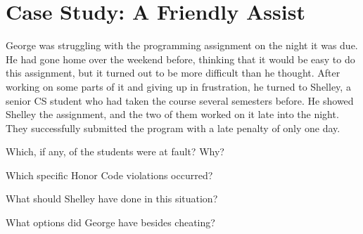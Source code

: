\section*{Case Study: A Friendly Assist}

George was struggling with the programming assignment on the night it was due.
He had gone home over the weekend before, thinking that it would be easy to do this assignment, but it turned out to be more difficult than he thought.
After working on some parts of it and giving up in frustration, he turned to Shelley, a senior CS student who had taken the course several semesters before.
He showed Shelley the assignment, and the two of them worked on it late into the night.
They successfully submitted the program with a late penalty of only one day.




\Q Which, if any, of the students were at fault? Why?

\begin{answer}[6em]
\end{answer}


\Q Which specific Honor Code violations occurred?

\begin{answer}[6em]
\end{answer}


\Q What should Shelley have done in this situation?

\begin{answer}[6em]
\end{answer}


\Q What options did George have besides cheating?

\begin{answer}[6em]
\end{answer}
